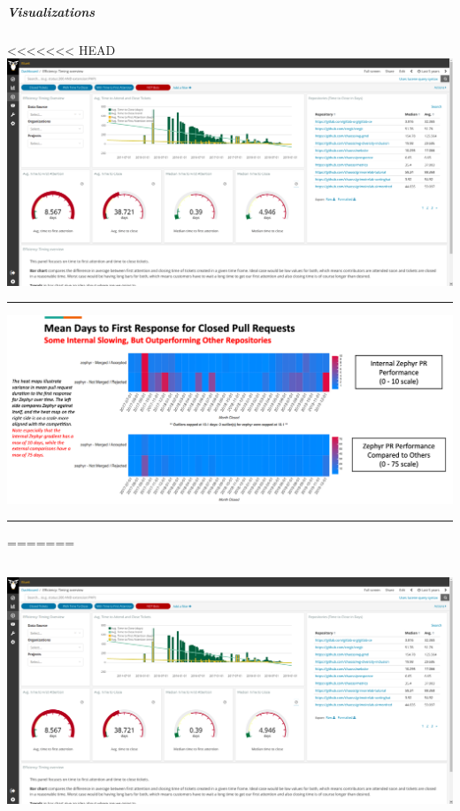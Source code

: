 \hypertarget{visualizations}{%
\subparagraph{Visualizations}\label{visualizations}}

<<<<<<< HEAD
\includegraphics{images/time-to-first-response_efficiency-timing-overview.png}

\begin{center}\rule{0.5\linewidth}{0.5pt}\end{center}

\includegraphics{images/time-to-first-response_augur-ttc-1.png}

\begin{center}\rule{0.5\linewidth}{0.5pt}\end{center}
=======
\hypertarget{grimoirelab-panel-efficiency-timing-overview}{%
\subsection{\texorpdfstring{\protect\includegraphics{images/time-to-first-response_efficiency-timing-overview.png}}{GrimoireLab Panel: Efficiency Timing Overview}}\label{grimoirelab-panel-efficiency-timing-overview}}

